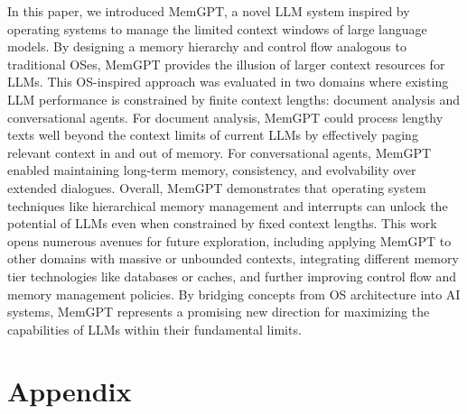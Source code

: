 \documentclass{article} %
\newcommand{\ours}{{{MemGPT}}\xspace}
\begin{document}
In this paper, we introduced \ours, a novel LLM system inspired by operating systems to manage the limited context windows of large language models. By designing a memory hierarchy and control flow analogous to traditional OSes, \ours provides the illusion of larger context resources for LLMs. This OS-inspired approach was evaluated in two domains where existing LLM performance is constrained by finite context lengths: document analysis and conversational agents. For document analysis, \ours could process lengthy texts well beyond the context limits of current LLMs by effectively paging relevant context in and out of memory. For conversational agents, \ours enabled maintaining long-term memory, consistency, and evolvability over extended dialogues. Overall, \ours demonstrates that operating system techniques like hierarchical memory management and interrupts can unlock the potential of LLMs even when constrained by fixed context lengths. This work opens numerous avenues for future exploration, including applying \ours to other domains with massive or unbounded contexts, integrating different memory tier technologies like databases or caches, and further improving control flow and memory management policies. By bridging concepts from OS architecture into AI systems, \ours represents a promising new direction for maximizing the capabilities of LLMs within their fundamental limits.









\newpage
\section{Appendix}

\end{document}
